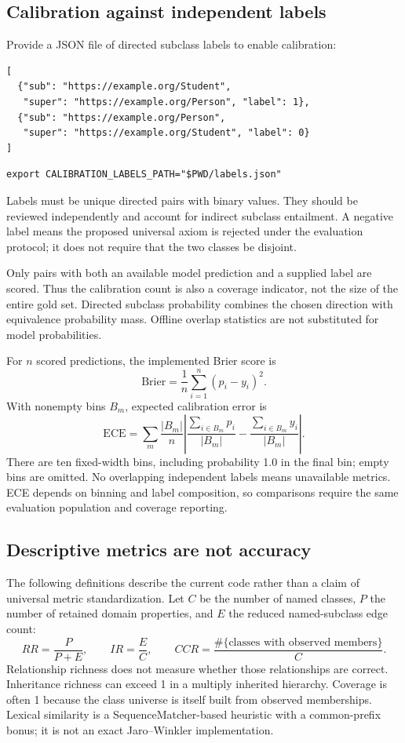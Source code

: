 \documentclass[11pt,a4paper]{article}
\begin{document}
\subsection{Calibration against independent labels}
Provide a JSON file of directed subclass labels to enable calibration:
\begin{lstlisting}
[
  {"sub": "https://example.org/Student",
   "super": "https://example.org/Person", "label": 1},
  {"sub": "https://example.org/Person",
   "super": "https://example.org/Student", "label": 0}
]
\end{lstlisting}
\begin{lstlisting}
export CALIBRATION_LABELS_PATH="$PWD/labels.json"
\end{lstlisting}
Labels must be unique directed pairs with binary values. They should be reviewed
independently and account for indirect subclass entailment. A negative label
means the proposed universal axiom is rejected under the evaluation protocol;
it does not require that the two classes be disjoint.

Only pairs with both an available model prediction and a supplied label are
scored. Thus the calibration count is also a coverage indicator, not the size of
the entire gold set. Directed subclass probability combines the chosen direction
with equivalence probability mass. Offline overlap statistics are not substituted
for model probabilities.

For $n$ scored predictions, the implemented Brier score is
\[
 \mathrm{Brier}=\frac{1}{n}\sum_{i=1}^{n}(p_i-y_i)^2.
\]
With nonempty bins $B_m$, expected calibration error is
\[
 \mathrm{ECE}=\sum_m\frac{|B_m|}{n}
   \left|\frac{\sum_{i\in B_m}p_i}{|B_m|}
              -\frac{\sum_{i\in B_m}y_i}{|B_m|}\right|.
\]
There are ten fixed-width bins, including probability 1.0 in the final bin;
empty bins are omitted. No overlapping independent labels means unavailable
metrics. ECE depends on binning and label composition, so comparisons require
the same evaluation population and coverage reporting.

\subsection{Descriptive metrics are not accuracy}
The following definitions describe the current code rather than a claim of
universal metric standardization. Let $C$ be the number of named classes, $P$
the number of retained domain properties, and $E$ the reduced named-subclass edge
count:
\[
 RR=\frac{P}{P+E},\qquad IR=\frac{E}{C},\qquad
 CCR=\frac{\#\{\text{classes with observed members}\}}{C}.
\]
Relationship richness does not measure whether those relationships are correct.
Inheritance richness can exceed 1 in a multiply inherited hierarchy. Coverage is
often 1 because the class universe is itself built from observed memberships.
Lexical similarity is a SequenceMatcher-based heuristic with a common-prefix
bonus; it is not an exact Jaro--Winkler implementation.
\end{document}
